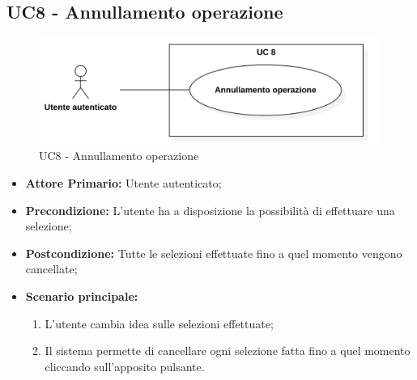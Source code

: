 \subsection{UC8 - Annullamento operazione}
\begin{figure}[H]
    \centering
    \includegraphics[scale = 0.7]{components/img/UC8.png}
    \caption{UC8 - Annullamento operazione}
\end{figure}
\begin{itemize}
\item \textbf{Attore Primario:} Utente autenticato;
\item \textbf{Precondizione:} L'utente ha a disposizione la possibilità di effettuare una selezione;
\item \textbf{Postcondizione:} Tutte le selezioni effettuate fino a quel momento vengono cancellate;
\item \textbf{Scenario principale:}
    \begin{enumerate}
    \item L'utente cambia idea sulle selezioni effettuate;
    \item Il sistema permette di cancellare ogni selezione fatta fino a quel momento cliccando sull'apposito pulsante.
    \end{enumerate}
\end{itemize}
